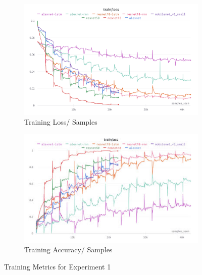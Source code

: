 \documentclass[a4paper]{article}
\begin{document}
  \newpage
  \restoregeometry

  \begin{figure}[ht]
    \centering
    \begin{subfigure}[b]{0.49\linewidth}
      \centering
      \includegraphics[width=\linewidth]{figures/experiment1-train-loss.png}
      \caption{Training Loss/ Samples}
      \label{fig:experiment1-train-acc}
    \end{subfigure}
    \hfill
    \begin{subfigure}[b]{0.49\linewidth}
      \centering
      \includegraphics[width=\linewidth]{figures/experiment1-train-acc.jpg}
      \caption{Training Accuracy/ Samples}
      \label{fig:experiment1-train-loss}
    \end{subfigure}
    \caption{Training Metrics for Experiment 1}
    \label{fig:experiment-1-training}
  \end{figure}
\end{document}
